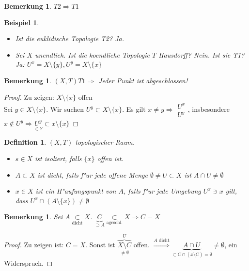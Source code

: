 \documentclass[a4paper,12pt,numbers=noenddot,parskip=full]{scrartcl}
\theoremstyle{dotless}
\newtheorem{definition}[theorem]{Definition}
\newtheorem{example}[theorem]{Beispiel}
\newtheorem{remark}[theorem]{Bemerkung}
\begin{document}
\begin{remark}
	$T2 \Rightarrow T1$
\end{remark}
\begin{example}
	\begin{itemize}
		\item Ist die euklidische Topologie T2? Ja.
		\item Sei $X$ unendlich. Ist die koendliche Topologie $T$ Hausdorff? Nein. Ist sie T1? Ja: $U^x = X \setminus \{y\}, U^y = X \setminus \{x\}$
	\end{itemize}
\end{example}
\begin{remark}
	$(X,T) T1 \Rightarrow$ Jeder Punkt ist abgeschlossen!
\end{remark}
\begin{proof}
	Zu zeigen: $X \setminus \{x\}$ offen\\
	Sei $y \in X \setminus \{x\}$. Wir suchen $U^y \subset X \setminus \{x\}$. Es gilt $x \neq y \Longrightarrow \begin{array}{l}
		U^x\\
		U^y
	\end{array}$, insbesondere $x \notin U^y \Longrightarrow \underset{\in Y}{U^y} \subset x \setminus \{x\}$
\end{proof}
\begin{definition}
	$(X,T)$ topologischer Raum. \begin{itemize}
		\item $s \in X$ ist \emph{isoliert}, falls $\{x\}$ offen ist.
		\item $A \subset X$ ist \emph{dicht}, falls f"ur jede offene Menge $\emptyset \neq U \subset X$ ist $A \cap U \neq \emptyset$
		\item $x \in X$ ist ein \emph{H"aufungspunkt von $A$}, falls f"ur jede Umgebung $U^x \ni x$ gilt, dass $U^x \cap (A\setminus \{x\}) \neq \emptyset$
	\end{itemize}
\end{definition}
\begin{remark}
	Sei $A \underset{\text{dicht}}{\subset} X$. $\underbrace{C}_{\supset A} \underset{\text{ageschl.}}{\subset} X \Longrightarrow C=X$
\end{remark}
\begin{proof}
	Zu zeigen ist: $C=X$. Sonst ist $\overbrace{\underset{\neq \emptyset}{X \setminus C}}^U$ offen. $\overset{A \text{ dicht}}{\Longrightarrow} \underbrace{A \cap U}_{\subset C \cap (x \setminus C) = \emptyset} \neq \emptyset$, ein Widerspruch.
\end{proof}
\end{document}
